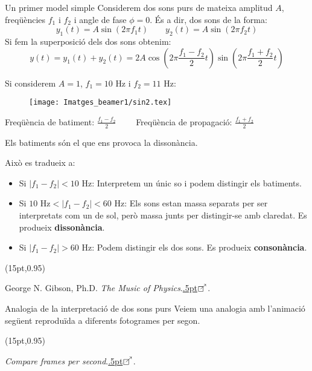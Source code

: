 \documentclass[10pt,hyperref={colorlinks,linkcolor=black,citecolor=blue,urlcolor=blue!70},handout]{beamer}
\newcommand\enllas{\raise.5pt\hbox{$\boxempty\kern-4.85pt{}^{\nearrow}$}\kern-2pt}
\newcommand\FrameText[1]{
  \begin{textblock*}{\paperwidth}(15pt,0.95\textheight)
    \tiny
    \raggedright #1\hspace{.5em}
  \end{textblock*}}
\begin{document}
\begin{frame}{Un primer model simple}
    Considerem dos sons purs de mateixa amplitud $A$, freqüències $f_1$ i $f_2$ i angle de fase $\phi=0$. És a dir, dos sons de la forma: $$y_1(t)=A\sin(2\pi f_1t)\qquad y_2(t)=A\sin(2\pi f_2t)$$\pause
    Si fem la superposició dels dos sons obtenim: $$y(t)=y_1(t)+y_2(t)=2A\cos\left(2\pi\frac{f_1-f_2}{2}t\right)\sin\left(2\pi\frac{f_1+f_2}{2}t\right)$$
\end{frame}
\begin{frame}{}
    Si considerem $A=1$, $f_1=10\text{ Hz}$ i $f_2=11\text{ Hz}$:\par\pause
    \begin{figure}
        \centering
        \texttt{[image: Imatges\_beamer1/sin2.tex]}
    \end{figure}
    Freqüència de batiment: $\frac{f_1-f_2}{2}\qquad$ Freqüència de propagació: $\frac{f_1+f_2}{2}$\par\pause
    Els batiments són el que ens provoca la dissonància.
\end{frame}
\begin{frame}{}
    Això es tradueix a:
    \begin{itemize}
        \item Si $|f_1-f_2|<10\text{ Hz}$: Interpretem un únic so i podem distingir els batiments.\pause
        \item Si $10\text{ Hz}<|f_1-f_2|<60\text{ Hz}$: Els sons estan massa separats per ser interpretats com un de sol, però massa junts per distingir-se amb claredat. Es produeix \textbf{dissonància}.\pause
        \item Si $|f_1-f_2|>60\text{ Hz}$: Podem distingir els dos sons. Es produeix \textbf{consonància}.
    \end{itemize}
    \FrameText{George N. Gibson, Ph.D. \textit{The Music of Physics}.\href{https://www.phys.uconn.edu/~gibson/Notes/Section5_5/Sec5_5.htm}{\enllas}.}
\end{frame}
\begin{frame}{Analogia de la interpretació de dos sons purs}
    Veiem una analogia amb l'animació següent reproduïda a diferents fotogrames per segon.\par
    \begin{center}
    \end{center}
    \FrameText{\textit{Compare frames per second}.\href{https://frames-per-second.appspot.com/}{\enllas}.}
\end{frame}
\end{document}
